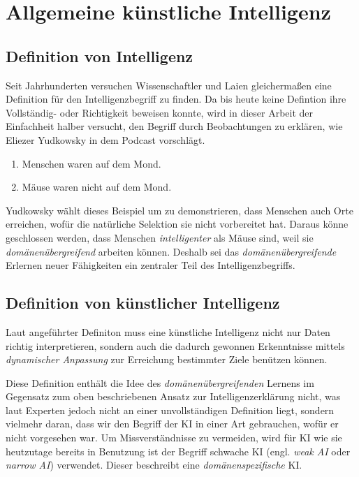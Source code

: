 \chapter{Allgemeine künstliche Intelligenz}
\section{Definition von Intelligenz}
Seit Jahrhunderten versuchen Wissenschaftler und Laien gleichermaßen eine Definition für den Intelligenzbegriff zu finden. Da bis heute keine Defintion ihre Vollständig- oder Richtigkeit beweisen konnte, wird in dieser Arbeit der Einfachheit halber versucht, den Begriff durch Beobachtungen zu erklären, wie Eliezer Yudkowsky in dem Podcast  vorschlägt.
\begin{enumerate}
\item Menschen waren auf dem Mond.
\item Mäuse waren nicht auf dem Mond.
\end{enumerate}
Yudkowsky wählt dieses Beispiel um zu demonstrieren, dass Menschen auch Orte erreichen, wofür die natürliche Selektion sie nicht vorbereitet hat. Daraus könne geschlossen werden, dass Menschen \emph{intelligenter} als Mäuse sind, weil sie \emph{domänenübergreifend} arbeiten können. Deshalb sei das \emph{domänenübergreifende} Erlernen neuer Fähigkeiten ein zentraler Teil des Intelligenzbegriffs. 
\section{Definition von künstlicher Intelligenz}

Laut angeführter Definiton muss eine künstliche Intelligenz nicht nur Daten richtig interpretieren, sondern auch die dadurch gewonnen Erkenntnisse mittels \emph{dynamischer Anpassung} zur Erreichung bestimmter Ziele benützen können.

Diese Definition enthält die Idee des \emph{domänenübergreifenden} Lernens im Gegensatz zum oben beschriebenen Ansatz zur Intelligenzerklärung nicht, was laut Experten jedoch nicht an einer unvollständigen Definition liegt, sondern vielmehr daran, dass wir den Begriff der KI in einer Art gebrauchen, wofür er nicht vorgesehen war. Um Missverständnisse zu vermeiden, wird für KI wie sie heutzutage bereits in Benutzung ist der Begriff schwache KI (engl. \emph{weak AI} oder \emph{narrow AI}) verwendet.  Dieser beschreibt eine \emph{domänenspezifische} KI.
